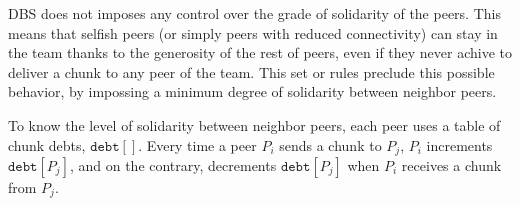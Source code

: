 
\begin{comment}
Notice that in this example, for the sake of simplicity, a simple
round-robing pending scheduler has been used.  Actually, DBS selects
the $\mathtt{pending}[]$ entries using the supportivity information
gathered from the neighbors. This information is stored in a
$\mathtt{supportivity}[]$ table, which is indexed by the neighbors
end-points. When the list of peers is received from the splitter, all
the peers have the same supportivity. These supportivity values are
incremented each time a chunk is received from the corresponding
neighbor and decremented each time a chunk is received form the
splitter (i.e., in each round). Thus, supportive neighbors will tend
to have a higher supportivity than unsupportive neighbors.
\end{comment}

DBS does not imposes any control over the grade of solidarity of the
peers. This means that selfish peers (or simply peers with reduced
connectivity) can stay in the team thanks to the generosity of the
rest of peers, even if they never achive to deliver a chunk to any
peer of the team. This set or rules preclude this possible behavior,
by impossing a minimum degree of solidarity between neighbor peers.

To know the level of solidarity between neighbor peers, each peer uses
a table of chunk debts, $\mathtt{debt}[]$. Every time a peer $P_i$
sends a chunk to $P_j$, $P_i$ increments $\mathtt{debt}[P_j]$, and on
the contrary, decrements $\mathtt{debt}[P_j]$ when $P_i$ receives a
chunk from $P_j$.

